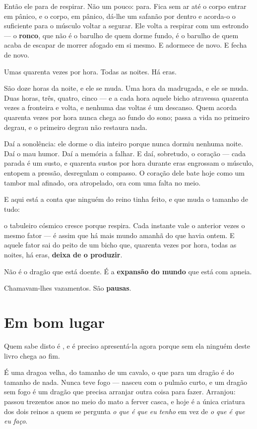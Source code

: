 \documentclass[livro.tex]{subfiles}
\begin{document}
Então ele para de respirar. Não um pouco: para. Fica sem ar até o corpo entrar em pânico, e o
corpo, em pânico, dá-lhe um safanão por dentro e acorda-o o suficiente para o músculo voltar a
segurar. Ele volta a respirar com um estrondo --- o \textbf{ronco}, que não é o barulho de quem
dorme fundo, é o barulho de quem acaba de escapar de morrer afogado em si mesmo. E adormece de
novo. E fecha de novo.

Umas quarenta vezes por hora. Todas as noites. Há eras.

\medskip

São doze horas da noite, e ele se muda. Uma hora da madrugada, e ele se muda. Duas horas, três,
quatro, cinco --- e a cada hora aquele bicho atravessa quarenta vezes a fronteira e volta, e
nenhuma das voltas é um descanso. Quem acorda quarenta vezes por hora nunca chega ao fundo do
sono; passa a vida no primeiro degrau, e o primeiro degrau não restaura nada.

Daí a sonolência: ele dorme o dia inteiro porque nunca dormiu nenhuma noite. Daí o mau humor.
Daí a memória a falhar. E daí, sobretudo, o coração --- cada parada é um susto, e quarenta sustos
por hora durante eras engrossam o músculo, entopem a pressão, desregulam o compasso. O coração
dele bate hoje como um tambor mal afinado, ora atropelado, ora com uma falta no meio.

\medskip

E aqui está a conta que ninguém do reino tinha feito, e que muda o tamanho de tudo:

o tabuleiro cósmico cresce porque \Ven respira. Cada instante vale o anterior vezes o mesmo
fator --- é assim que há mais mundo amanhã do que havia ontem. E aquele fator sai do peito de um
bicho que, quarenta vezes por hora, todas as noites, há eras, \textbf{deixa de o produzir}.

Não é o dragão que está doente. É a \textbf{expansão do mundo} que está com apneia.

Chamavam-lhes vazamentos. São \textbf{pausas}.

\chapter{Em bom lugar}

Quem sabe disto é \Qui , e é preciso apresentá-la agora porque sem ela ninguém deste livro chega
ao fim.

É uma dragoa velha, do tamanho de um cavalo, o que para um dragão é do tamanho de nada. Nunca
teve fogo --- nasceu com o pulmão curto, e um dragão sem fogo é um dragão que precisa arranjar
outra coisa para fazer. Arranjou: passou trezentos anos no meio do mato a ferver casca, e hoje é
a única criatura dos dois reinos a quem se pergunta \emph{o que é que eu tenho} em vez de
\emph{o que é que eu faço}.
\end{document}
